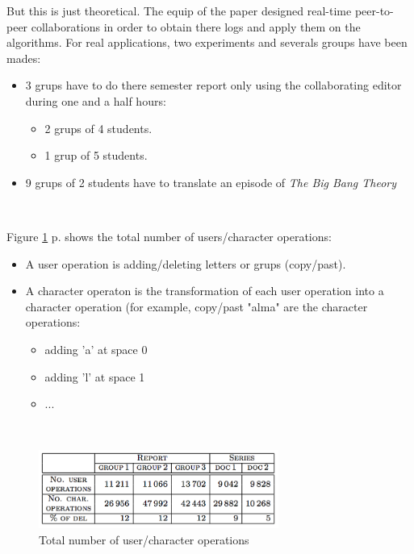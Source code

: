 But this is just theoretical. The equip of the paper designed real-time peer-to-peer collaborations in order to obtain there logs and apply them on the algorithms. For real applications, two experiments and severals groups have been mades:
\begin{itemize}
	\item 3 grups have to do there semester report only using the collaborating editor during one and a half hours:
		\begin{itemize}
			\item 2 grups of 4 students.
			\item 1 grup of 5 students.
		\end{itemize}
	\item 9 grups of 2 students have to translate an episode of \emph{The Big Bang Theory}
\end{itemize}~

Figure \ref{fig:operations} p.\pageref{fig:operations} shows the total number of users/character operations:
\begin{itemize}
	\item A user operation is adding/deleting letters or grups (copy/past).
	\item A character operaton is the transformation of each user operation into a character operation (for example, copy/past "alma" are the character operations: \begin{itemize}
					\item adding 'a' at space 0
					\item adding 'l' at space 1
					\item ...
				\end{itemize}
\end{itemize}~

\begin{figure}[h]
  \center
  \includegraphics[width=0.7\textwidth]{includes/operations.png}
  \caption{Total number of user/character operations}
  \label{fig:operations}
\end{figure}